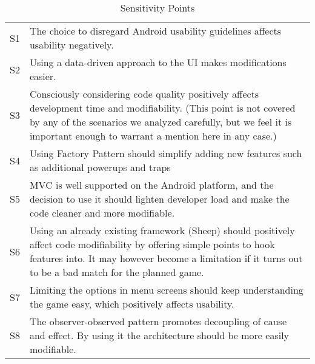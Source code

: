 \begin{table}[H]
	\begin{center}
		\begin{tabular}{| c | p{10cm} | }
    		\hline
			S1 & The choice to disregard Android usability guidelines affects
			     usability negatively.\\
			S2 & Using a data-driven approach to the UI makes modifications
			     easier.\\
			S3 & Consciously considering code quality positively affects
			     development time and modifiability. (This point is not
			     covered by any of the scenarios we analyzed carefully,
			     but we feel it is important enough to warrant a mention
			     here in any case.)\\
			S4 & Using Factory Pattern should simplify adding new features
			     such as additional powerups and traps\\															
			S5 & MVC is well supported on the Android platform, and the
			     decision to use it should lighten developer load and
			     make the code cleaner and more modifiable.\\
			S6 & Using an already existing framework (Sheep) should
			     positively affect code modifiability by offering simple
			     points to hook features into.  It may however become a
			     limitation if it turns out to be a bad match for the
			     planned game.\\
		    S7 & Limiting the options in menu screens should keep understanding
		         the game easy, which positively affects usability.\\
		    S8 & The observer-observed pattern promotes decoupling of
		         cause and effect. By using it the architecture should be
		         more easily modifiable.\\
			\hline
    	\end{tabular}
	\end{center}
	\label{tab:sensetivityPoints}
	\caption{Sensitivity Points}
\end{table}
